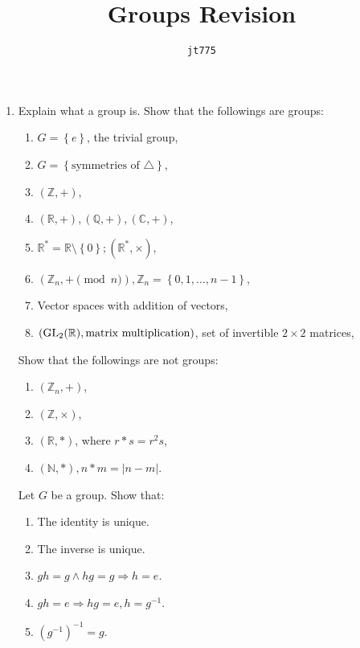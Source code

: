 \documentclass[11pt]{article}
\title{\textbf{Groups Revision}}
\author{\texttt{jt775}}
\date{\null}
\newlength{\qspace}
\newcounter{qnumber}
\newenvironment{question}%
 {\vspace{\qspace}
  \begin{enumerate}[\bfseries 1\quad][10]%
    \setcounter{enumi}{\value{qnumber}}%
    \item%
 }
{
  \end{enumerate}
  \filbreak
  \stepcounter{qnumber}
 }
\begin{document}
\maketitle
\vspace{-1.5cm}
\begin{question}
  Explain what a group is. Show that the followings are groups:

\begin{multicols}{2}
  \begin{enumerate}
    \item $G = \left\{ e\right\}$, the trivial group,
    \item $ G = \left\{ \text{symmetries of } \triangle \right\} $,
    \item $ (\mathbb{Z} , +) $,
    \item $ (\mathbb{R} ,+), (\mathbb{Q} , +), (\mathbb{C} , +) $,
    \item $ \mathbb{R}^* = \mathbb{R} \setminus \left\{ 0\right\}; (\mathbb{R}^*, \times) $,
    \item $ (\mathbb{Z}_n, + \pmod n), \mathbb{Z}_n = \left\{ 0,1,\dots, n-1\right\} $,
    \item Vector spaces with addition of vectors,
    \item $ (\rm{GL}_2(\mathbb{R}), \text{matrix multiplication}) $, set of invertible $2\times 2$ matrices,
\end{enumerate}
\end{multicols}

Show that the followings are not groups:

\begin{multicols}{2}
  \begin{enumerate}
    \item $ (\mathbb{Z}_n, +) $,
    \item $ (\mathbb{Z} , \times) $,
    \item $ (\mathbb{R} , *) $, where $ r*s = r^2 s $,
    \item $ (\mathbb{N}, *), n*m = |n-m| $.
  \end{enumerate}
\end{multicols}

Let $G$ be a group. Show that:

\begin{multicols}{2}
  \begin{enumerate}
    \item The identity is unique.
    \item The inverse is unique.
    \item $ gh=g \land hg=g \Rightarrow h=e $.
    \item $ gh=e \Rightarrow hg=e, h=g^{-1} $.
    \item $ (g^{-1})^{-1}=g $.
\end{enumerate}
\end{multicols}


\end{question}
\end{document}
